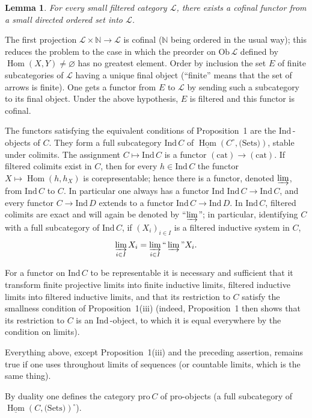 \documentclass[11pt]{amsart}
\DeclareMathOperator{\Hom}{Hom}
\newcommand{\Ind}{\text{Ind}\,}
\newcommand{\Pro}{\text{pro}\,}
\newcommand{\cL}{\mathcal{L}}
\newcommand{\cD}{D}
\theoremstyle{plain}
\newtheorem{lem}{Lemma}
\theoremstyle{definition}
\begin{document}
\begin{lem}
For every small filtered category $\cL$, there exists a cofinal functor from a small directed ordered set into $\cL$.
\end{lem}

The first projection $\cL\times \mathbb{N}\to \cL$ is cofinal ($\mathbb{N}$ being ordered in the usual way); this reduces the problem to the case in which the preorder on $\mathrm{Ob}\,\cL$ defined by $\Hom(X,Y)\neq\varnothing$ has no greatest element. Order by inclusion the set $E$ of finite subcategories of $\cL$ having a unique final object (``finite'' means that the set of arrows is finite). One gets a functor from $E$ to $\cL$ by sending such a subcategory to its final object. Under the above hypothesis, $E$ is filtered and this functor is cofinal.

The functors satisfying the equivalent conditions of Proposition~1 are the $\Ind$-objects of $C$. They form a full subcategory $\Ind C$ of $\underline{\Hom}(C^{\circ},\text{(Sets)})$, stable under colimits. The assignment $C\mapsto \Ind C$ is a functor $(\mathrm{cat})\to(\mathrm{cat})$. If filtered colimits exist in $C$, then for every $h\in\Ind C$ the functor $X\mapsto\Hom(h,h_X)$ is corepresentable; hence there is a functor, denoted $\varinjlim$, from $\Ind C$ to $C$. In particular one always has a functor $\Ind\,\Ind C\to \Ind C$, and every functor $C\to \Ind\cD$ extends to a functor $\Ind C\to\Ind\cD$. In $\Ind C$, filtered colimits are exact and will again be denoted by ``$\varinjlim$''; in particular, identifying $C$ with a full subcategory of $\Ind C$, if $(X_i)_{i\in I}$ is a filtered inductive system in $C$,
\[
\varinjlim_{i\in I} X_i=\varinjlim_{i\in I}\text{``}\varinjlim\text{''}X_i.
\]

For a functor on $\Ind C$ to be representable it is necessary and sufficient that it transform finite projective limits into finite inductive limits, filtered inductive limits into filtered inductive limits, and that its restriction to $C$ satisfy the smallness condition of Proposition~1(iii) (indeed, Proposition~1 then shows that its restriction to $C$ is an $\Ind$-object, to which it is equal everywhere by the condition on limits).

Everything above, except Proposition~1(iii) and the preceding assertion, remains true if one uses throughout limits of sequences (or countable limits, which is the same thing).

By duality one defines the category $\Pro C$ of pro-objects (a full subcategory of $\underline{\Hom}(C,\text{(Sets)})^{\circ}$).
\end{document}
